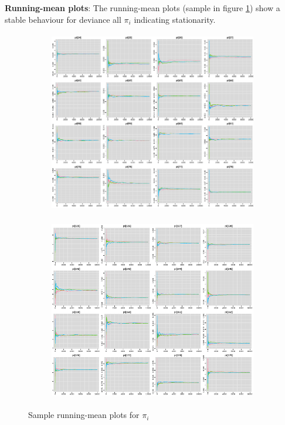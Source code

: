 \documentclass[12pt]{article}
\begin{document}
\textbf{Running-mean plots}: The running-mean plots (sample in figure \ref{fig:runningmeanM1}) show a stable behaviour for deviance all $\pi_i$ indicating stationarity.

\begin{figure}[h!]
    \centering
    \begin{subfigure}{0.45\textwidth}
        \includegraphics[width=\linewidth, height=8cm]{pictures/rmean2.png}
    \end{subfigure}
    \begin{subfigure}{0.45\textwidth}
        \includegraphics[width=\linewidth, height=8cm]{pictures/rmean3.png}
    \end{subfigure}
    
    \caption{Sample running-mean plots for $\pi_i$}
    \label{fig:runningmeanM1}
\end{figure}
\FloatBarrier %
\end{document}
